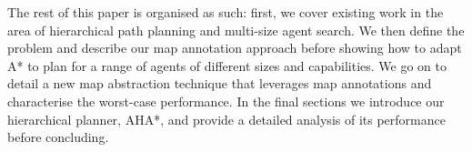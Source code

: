 \par \indent
The rest of this paper is organised as such: first, we cover existing work in the area of hierarchical path planning and multi-size agent search. We then define the problem and describe our map annotation approach before showing how to adapt A* to plan for a range of agents of different sizes and capabilities. We go on to detail a new map abstraction technique that leverages map annotations and characterise the worst-case performance. In the final sections we introduce our hierarchical planner, AHA*, and provide a detailed analysis of its performance before concluding. 

